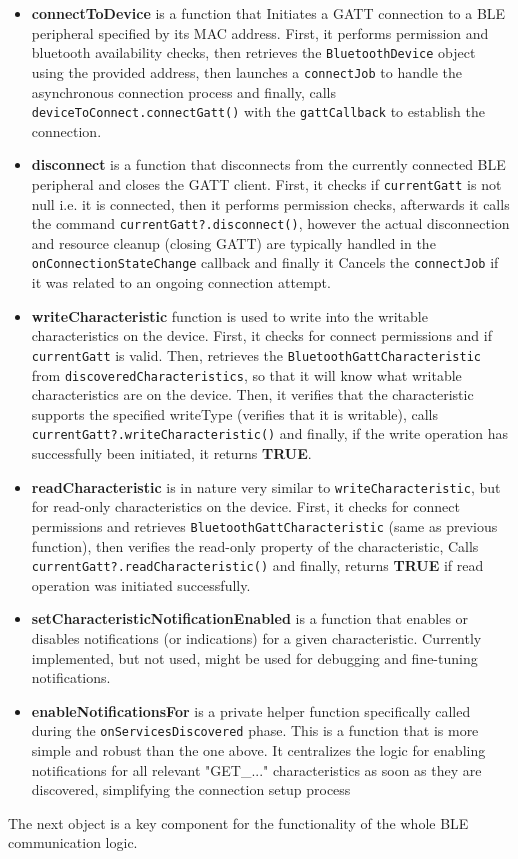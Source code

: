 \begin{itemize}
	\item \textbf{connectToDevice} is a function that Initiates a \ac{GATT} connection to a \ac{BLE} peripheral specified by its \ac{MAC} address. First, it performs permission and bluetooth availability checks, then retrieves the \texttt{BluetoothDevice} object using the provided address, then launches a \texttt{connectJob} to handle the asynchronous connection process and finally, calls \texttt{deviceToConnect.connectGatt()} with the \texttt{gattCallback} to establish the connection.
	\item \textbf{disconnect} is a function that disconnects from the currently connected \ac{BLE} peripheral and closes the \ac{GATT} client. First, it checks if \texttt{currentGatt} is not null i.e. it is connected, then it performs permission checks, afterwards it calls the command \texttt{currentGatt?.disconnect()}, however the actual disconnection and resource cleanup (closing \ac{GATT}) are typically handled in the \texttt{onConnectionStateChange} callback and finally it  Cancels the \texttt{connectJob} if it was related to an ongoing connection attempt.
	\item \textbf{writeCharacteristic} function is used to write into the writable characteristics on the device. First, it checks for connect permissions and if \texttt{currentGatt} is valid. Then, retrieves the \texttt{BluetoothGattCharacteristic} from \texttt{discoveredCharacteristics}, so that it will know what writable characteristics are on the device. Then, it verifies that the characteristic supports the specified writeType (verifies that it is writable), calls \texttt{currentGatt?.writeCharacteristic()} and finally, if the write operation has successfully been initiated, it returns \textbf{TRUE}.
	\item \textbf{readCharacteristic} is in nature very similar to \texttt{writeCharacteristic}, but for read-only characteristics on the device. First, it checks for connect permissions and retrieves \texttt{BluetoothGattCharacteristic} (same as previous function), then verifies the read-only property of the characteristic,  Calls \texttt{currentGatt?.readCharacteristic()} and finally, returns \textbf{TRUE} if read operation was initiated successfully.
	\item \textbf{setCharacteristicNotificationEnabled} is a function that enables or disables notifications (or indications) for a given characteristic. Currently implemented, but not used, might be used for debugging and fine-tuning notifications.
	\item \textbf{enableNotificationsFor} is a private helper function specifically called during the \texttt{onServicesDiscovered} phase. This is a function that is more simple and robust than the one above. It centralizes the logic for enabling notifications for all relevant "GET\_..." characteristics as soon as they are discovered, simplifying the connection setup process
\end{itemize}
The next object is a key component for the functionality of the whole \ac{BLE} communication logic. 

